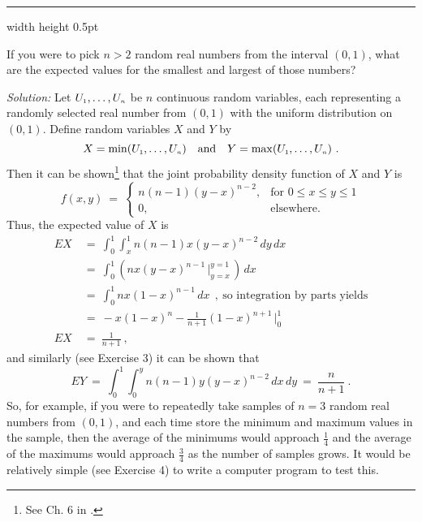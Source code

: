 \medskip
\hrule width \textwidth height 0.5pt
\begin{exmp}\label{exmp:minmaxexpval}
 If you were to pick $n > 2$ random real numbers from the interval $(0,1)$, what are the expected values for the
 smallest and largest of those numbers?\smallskip
\par\noindent \emph{Solution:} 
Let $U_{\scriptscriptstyle 1}, \dots , U_{\scriptscriptstyle n}$ be $n$ continuous random variables, each representing a randomly selected real number from $(0,1)$ with the uniform distribution on $(0,1)$.
 Define random variables $X$ and $Y$ by
 \begin{displaymath}
  X = \min(U_{\scriptscriptstyle 1}, \dots , U_{\scriptscriptstyle n}) \quad \text{and} \quad Y = \max(U_{\scriptscriptstyle 1}, \dots , U_{\scriptscriptstyle n}) ~.
 \end{displaymath}
 Then it can be shown\footnote{See Ch. 6 in \cite{hps}.} that the joint probability density function of $X$ and $Y$ is
\begin{equation}\label{eqn:minmaxexpval}
 f(x,y) ~=~ \begin{cases}
  n(n-1)(y-x)^{n-2}, &\text{for $0 \le x \le y \le 1$}\\
  0, &\text{elsewhere.}
 \end{cases}
\end{equation}
Thus, the expected value of $X$ is
\begin{align*}
 EX ~&=~ \int_0^1 \int_x^1 n(n-1)x(y-x)^{n-2} \,dy\,dx\\
  &=~ \int_0^1 \left( nx(y-x)^{n-1} \,\Big|_{y=x}^{y=1} \,\right)\,dx\\
  &=~ \int_0^1 nx(1-x)^{n-1} \,dx~~,~\text{so integration by parts yields}\\
  &=~ -x(1-x)^n - \frac{1}{n+1}(1-x)^{n+1} \,\Big|_0^1\\
 EX ~&=~ \frac{1}{n+1} ~,
\end{align*}
and similarly (see Exercise 3) it can be shown that
\begin{displaymath}
 EY ~=~ \int_0^1 \int_0^y n(n-1)y(y-x)^{n-2} \,dx\,dy ~=~ \frac{n}{n+1} ~.
\end{displaymath}
So, for example, if you were to repeatedly take samples of $n=3$ random real numbers from $(0,1)$, and each time store
the minimum and maximum values in the sample, then the average of the minimums would approach $\frac{1}{4}$ and the
average of the maximums would approach $\frac{3}{4}$ as the number of samples grows. It would be relatively simple (see
Exercise 4) to write a computer program to test this.
\end{exmp}
